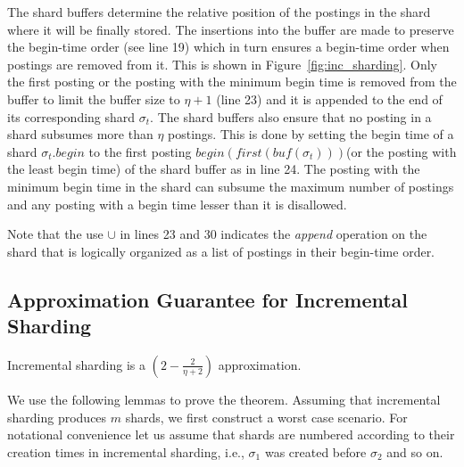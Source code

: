 The shard buffers determine the relative position of the postings in the shard where it will be finally stored. The insertions into the buffer are made to preserve the begin-time order (see line 19) which in turn ensures a begin-time order when postings are removed from it. This is shown in Figure~\ref{fig:inc_sharding}. Only the first posting or the posting with the minimum begin time is removed from the buffer to limit the buffer size to $\eta + 1$ (line 23) and it is appended to the end of its corresponding shard $\sigma_t$. The shard buffers also ensure that no posting in a shard subsumes more than $\eta$ postings. This is done by setting the begin time of a shard $\sigma_t.begin$ to the first posting $begin(first(buf(\sigma_t)))$(or the posting with the least begin time) of the shard buffer as in line 24. The posting with the minimum begin time in the shard can subsume the maximum number of postings and any posting with a begin time lesser than it is disallowed.

Note that the use $\cup$ in lines 23 and 30 indicates the \emph{append} operation on the shard that is logically organized as a list of postings in their begin-time order.


\subsection{Approximation Guarantee for Incremental Sharding}
\label{proof:approx_guarantee}

\begin{theorem}
\label{thm:inc_sharding}  
Incremental sharding is a $(2- \frac{2}{\eta+2})$ approximation.
\end{theorem}

We use the following lemmas to prove the theorem.
Assuming that incremental sharding produces $m$ shards, we first construct a worst case scenario. For notational convenience let us assume that shards are numbered according to their creation times in incremental sharding, i.e., $\sigma_1$ was created before $\sigma_2$ and so on. 

